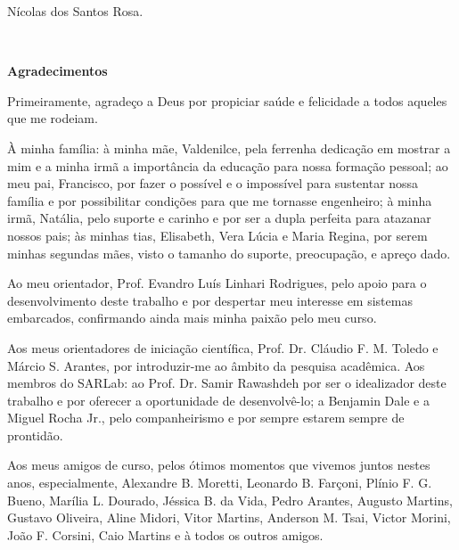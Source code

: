 \begin{flushright}
Nícolas dos Santos Rosa.
\end{flushright}

\cleardoublepage

\
\vspace{0.11\textheight} 

\begin{center}
\textbf{\Huge{Agradecimentos}}
\end{center}

\vspace{0.05\textheight}
			
Primeiramente, agradeço a Deus por propiciar saúde e felicidade a todos aqueles que me rodeiam.

À minha família: à minha mãe, Valdenilce, pela ferrenha dedicação em mostrar a mim e a minha irmã a importância da educação para nossa formação pessoal; ao meu pai, Francisco, por fazer o possível e o impossível para sustentar nossa família e por possibilitar condições para que me tornasse engenheiro; à minha irmã, Natália, pelo suporte e carinho e por ser a dupla perfeita para atazanar nossos pais; às minhas tias, Elisabeth, Vera Lúcia e Maria Regina, por serem minhas segundas mães, visto o tamanho do suporte, preocupação, e apreço dado. 

Ao meu orientador, Prof. Evandro Luís Linhari Rodrigues, pelo apoio para o desenvolvimento deste trabalho e por despertar meu interesse em sistemas embarcados, confirmando ainda mais minha paixão pelo meu curso.  

Aos meus orientadores de iniciação científica, Prof. Dr. Cláudio F. M. Toledo e Márcio S. Arantes, por introduzir-me ao âmbito da pesquisa acadêmica. Aos membros do SARLab: ao Prof. Dr. Samir Rawashdeh por ser o idealizador deste trabalho e por oferecer a oportunidade de desenvolvê-lo; a Benjamin Dale e a Miguel Rocha Jr., pelo companheirismo e por sempre estarem sempre de prontidão.

Aos meus amigos de curso, pelos ótimos momentos que vivemos juntos nestes anos, especialmente, Alexandre B. Moretti, Leonardo B. Farçoni, Plínio F. G. Bueno, Marília L. Dourado,  Jéssica B. da Vida, Pedro Arantes, Augusto Martins, Gustavo Oliveira, Aline Midori, Vitor Martins, Anderson M. Tsai, Victor Morini, João F. Corsini, Caio Martins e à todos os outros amigos. 

